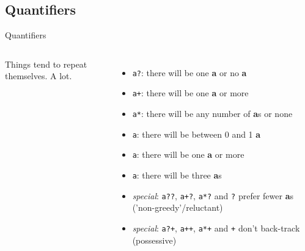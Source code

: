 \documentclass[english,aspectratio=169]{beamer}
\begin{document}
\subsection{Quantifiers}
\begin{frame}{Quantifiers}
\begin{columns}
        Things tend to repeat themselves. A lot.
        \begin{itemize}
            \item \texttt{a?}: there will be one \textbf{a} or no \textbf{a}
            \item \texttt{a+}: there will be one \textbf{a} or more
            \item \texttt{a*}: there will be any number of \textbf{a}s or none
            \item \texttt{a}: there will be between 0 and 1 \textbf{a}
            \item \texttt{a}: there will be one \textbf{a} or more
            \item \texttt{a\string{3\string}}: there will be three \textbf{a}s
            \item<2-> \textit{special}: \texttt{a??}, \texttt{a+?}, \texttt{a*?} and \texttt{\string{\string}?} prefer fewer \textbf{a}s ('non-greedy'/reluctant)
            \item<2-> \textit{special}: \texttt{a?+}, \texttt{a++}, \texttt{a*+} and \texttt{\string{\string}+} don't back-track (possessive)
        \end{itemize}
        \begin{center}
        \end{center}
\end{columns}
\end{frame}
\end{document}
